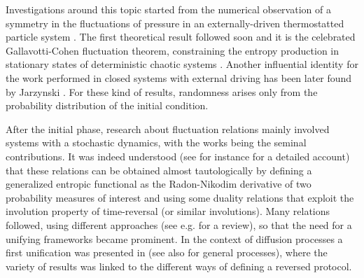 \documentclass[a4paper,11pt]{article}
\numberwithin{equation}{section}
\begin{document}
Investigations around this topic started from the numerical observation of a symmetry in the fluctuations of pressure in an externally-driven thermostatted particle system \cite{ECM93}.
The first theoretical result followed soon and it is the celebrated Gallavotti-Cohen fluctuation theorem, constraining the entropy production in stationary states of deterministic chaotic systems \cite{GC95a,GC95b}. Another influential identity for the work performed in closed systems with external driving has been later found by Jarzynski \cite{Jar97}. For these kind of results, randomness arises only from the probability distribution of the initial condition.


After the initial phase, research about fluctuation relations mainly involved systems with a stochastic dynamics, with the works \cite{Kur98,LS99,Mae99} being the seminal contributions. 
It was indeed understood (see for instance \cite{Mae99} for a detailed account) that these relations can be obtained almost tautologically by defining a generalized entropic functional as the Radon-Nikodim derivative of two probability measures of interest and using some duality relations that exploit the involution property of time-reversal (or similar involutions).
Many relations followed, using different approaches (see e.g. \cite{Sei12} for a review), so that the need for a unifying frameworks became prominent.  In the context of diffusion processes a first unification was presented in \cite{CG08} (see also \cite{Che18} for general processes), where the variety of results was linked to the different ways of defining a reversed protocol.
 
\end{document}
